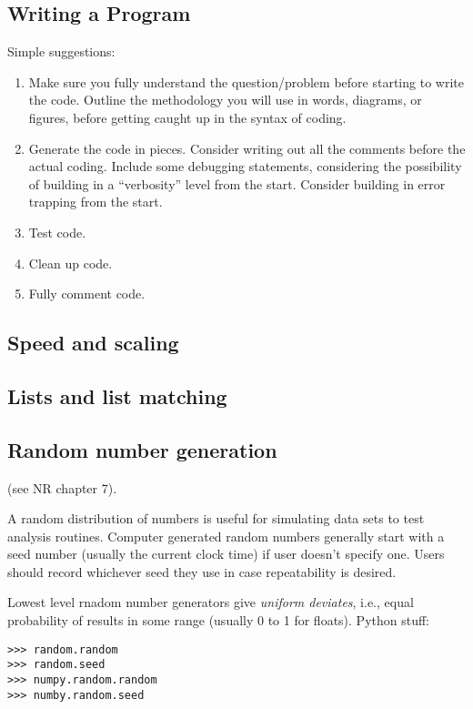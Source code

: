 \documentclass[12pt]{article}
\begin{document}
\subsection{Writing a Program}
Simple suggestions:
\begin{enumerate}
    \item Make sure you fully understand the question/problem before
        starting to write the code. Outline the methodology you will
        use in words, diagrams,
        or figures, before getting caught up in the syntax of coding.
    \item Generate the code in pieces. Consider writing out all the comments
        before the actual coding. Include some debugging statements, considering
        the possibility of building in a ``verbosity'' level from the start.
        Consider building in error trapping from the start.
    \item Test code.
    \item Clean up code.
    \item Fully comment code.
\end{enumerate}

\subsection{Speed and scaling}
\subsection{Lists and list matching}
\subsection{Random number generation}
(see NR chapter 7).

A random distribution of numbers is useful for simulating data sets to test
analysis routines. Computer generated random numbers generally start with a seed
number (usually the current clock time) if user doesn't specify one. Users should
record whichever seed they use in case repeatability is desired.

Lowest level rnadom number generators give \emph{uniform deviates}, i.e., equal
probability of results in some range (usually 0 to 1 for floats).
Python stuff:

\begin{verbatim}
>>> random.random
>>> random.seed
>>> numpy.random.random
>>> numby.random.seed
\end{verbatim}
\end{document}
